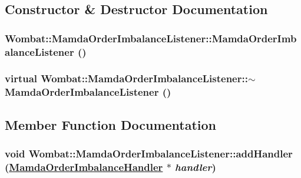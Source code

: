 \subsection{Constructor \& Destructor Documentation}
\hypertarget{classWombat_1_1MamdaOrderImbalanceListener_715d1ae2811b3dfc5bf2475dbc45ce59}{
\subsubsection[MamdaOrderImbalanceListener]{\setlength{\rightskip}{0pt plus 5cm}Wombat::Mamda\-Order\-Imbalance\-Listener::Mamda\-Order\-Imbalance\-Listener ()}}
\label{classWombat_1_1MamdaOrderImbalanceListener_715d1ae2811b3dfc5bf2475dbc45ce59}


\hypertarget{classWombat_1_1MamdaOrderImbalanceListener_ac342b8ded254fe784abe31afb3dfb91}{
\subsubsection[$\sim$MamdaOrderImbalanceListener]{\setlength{\rightskip}{0pt plus 5cm}virtual Wombat::Mamda\-Order\-Imbalance\-Listener::$\sim$Mamda\-Order\-Imbalance\-Listener ()}}
\label{classWombat_1_1MamdaOrderImbalanceListener_ac342b8ded254fe784abe31afb3dfb91}




\subsection{Member Function Documentation}
\hypertarget{classWombat_1_1MamdaOrderImbalanceListener_13083aab1c61080615dd411b4caa8ce6}{
\subsubsection[addHandler]{\setlength{\rightskip}{0pt plus 5cm}void Wombat::Mamda\-Order\-Imbalance\-Listener::add\-Handler (\hyperlink{classWombat_1_1MamdaOrderImbalanceHandler}{Mamda\-Order\-Imbalance\-Handler} $\ast$ {\em handler})}}
\label{classWombat_1_1MamdaOrderImbalanceListener_13083aab1c61080615dd411b4caa8ce6}


